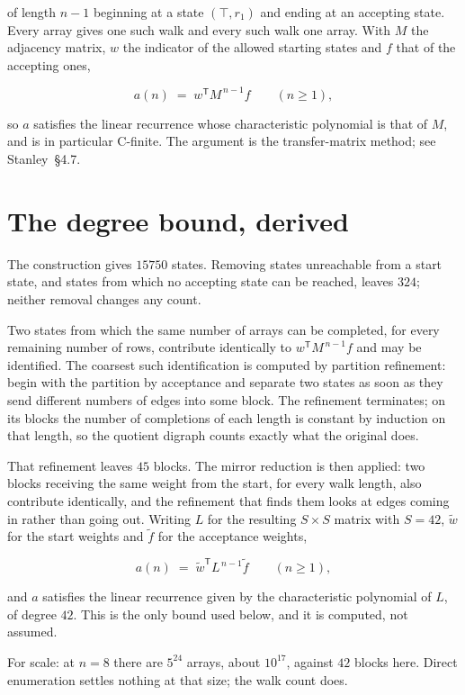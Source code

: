 \documentclass[11pt]{article}
\theoremstyle{definition}
\begin{document}
of length $n-1$ beginning at a state $(\top,r_1)$ and ending at an accepting state. Every array gives one such walk and every such walk one array. With $M$ the adjacency matrix, $w$ the indicator of the allowed starting states and $f$ that of the accepting ones,

\[a(n) \;=\; w^{\mathsf T} M^{\,n-1} f \qquad (n \ge 1),\]

so $a$ satisfies the linear recurrence whose characteristic polynomial is that of $M$, and is in particular C-finite. The argument is the transfer-matrix method; see Stanley~\S4.7.

\section{The degree bound, derived}

The construction gives $15750$ states. Removing states unreachable from a start state, and states from which no accepting state can be reached, leaves $324$; neither removal changes any count.

Two states from which the same number of arrays can be completed, for every remaining number of rows, contribute identically to $w^{\mathsf T}M^{\,n-1}f$ and may be identified. The coarsest such identification is computed by partition refinement: begin with the partition by acceptance and separate two states as soon as they send different numbers of edges into some block. The refinement terminates; on its blocks the number of completions of each length is constant by induction on that length, so the quotient digraph counts exactly what the original does.

That refinement leaves $45$ blocks. The mirror reduction is then applied: two blocks receiving the same weight from the start, for every walk length, also contribute identically, and the refinement that finds them looks at edges coming in rather than going out. Writing $L$ for the resulting $S \times S$ matrix with $S = 42$, $\tilde w$ for the start weights and $\tilde f$ for the acceptance weights,

\[a(n) \;=\; \tilde w^{\mathsf T} L^{\,n-1} \tilde f \qquad (n \ge 1),\]

and $a$ satisfies the linear recurrence given by the characteristic polynomial of $L$, of degree $42$. This is the only bound used below, and it is computed, not assumed.

For scale: at $n = 8$ there are $5^{24}$ arrays, about $10^{17}$, against $42$ blocks here. Direct enumeration settles nothing at that size; the walk count does.
\end{document}
